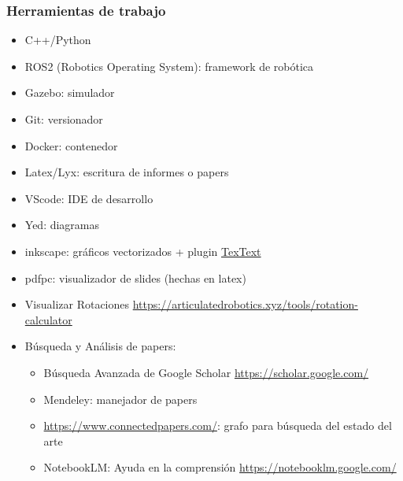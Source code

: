 \begin{frame}
    \frametitle{Herramientas de trabajo}

    \begin{itemize}
        \item C++/Python
        \item ROS2 (Robotics Operating System): framework de robótica
        \item Gazebo: simulador
        \item Git: versionador
        \item Docker: contenedor
        \item Latex/Lyx: escritura de informes o papers
        \item VScode: IDE de desarrollo
        \item Yed: diagramas
        \item inkscape: gráficos vectorizados + plugin \href{https://textext.github.io/textext/}{TexText}
        \item pdfpc: visualizador de slides (hechas en latex)
        \item Visualizar Rotaciones \url{https://articulatedrobotics.xyz/tools/rotation-calculator}
        \item Búsqueda y Análisis de papers:
        \begin{itemize}
            \item Búsqueda Avanzada de Google Scholar \url{https://scholar.google.com/}
            \item Mendeley: manejador de papers
            \item \url{https://www.connectedpapers.com/}: grafo para búsqueda del estado del arte
            \item NotebookLM: Ayuda en la comprensión \url{https://notebooklm.google.com/}
        \end{itemize}
    \end{itemize}
\end{frame}